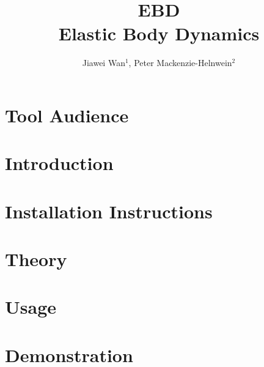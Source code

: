 \documentclass{simcenterdocumentation}
\begin{document}
\title{EBD\\ \Large Elastic Body Dynamics}
\author{Jiawei Wan$^{1}$, Peter Mackenzie-Helnwein$^2$}

\hypersetup{pageanchor=false}
\maketitle
\copyrightpage
\acknowledgments

\hypersetup{pageanchor=true}
\begin{frontmatter}

\pagestyle{plain}
{
  \renewcommand{\thispagestyle}[1]{}
  \tableofcontents
  \clearpage
  \listoffigures
}

\end{frontmatter}
\pagestyle{somewhatsimple}

\chapter{Tool Audience}


\chapter{Introduction}


\chapter{Installation Instructions}


\chapter{Theory}


\chapter{Usage}


\chapter{Demonstration}






\pagestyle{plain}
{
  \renewcommand{\thispagestyle}[1]{}
  \printbibliography           
}
\end{document}
